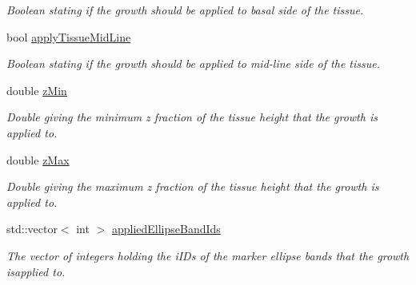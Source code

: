 \begin{DoxyCompactItemize}
\begin{DoxyCompactList}\small\item\em Boolean stating if the growth should be applied to basal side of the tissue. \end{DoxyCompactList}\item 
\hypertarget{classGrowthFunctionBase_a95cb51fffd8fbb1466510cc40853aeed}{}bool \hyperlink{classGrowthFunctionBase_a95cb51fffd8fbb1466510cc40853aeed}{apply\+Tissue\+Mid\+Line}\label{classGrowthFunctionBase_a95cb51fffd8fbb1466510cc40853aeed}

\begin{DoxyCompactList}\small\item\em Boolean stating if the growth should be applied to mid-\/line side of the tissue. \end{DoxyCompactList}\item 
\hypertarget{classGrowthFunctionBase_aa0d3867bc9072d342ca8b7f84800e04b}{}double \hyperlink{classGrowthFunctionBase_aa0d3867bc9072d342ca8b7f84800e04b}{z\+Min}\label{classGrowthFunctionBase_aa0d3867bc9072d342ca8b7f84800e04b}

\begin{DoxyCompactList}\small\item\em Double giving the minimum z fraction of the tissue height that the growth is applied to. \end{DoxyCompactList}\item 
\hypertarget{classGrowthFunctionBase_ac4696285be059f2dfacd195f0bbb5328}{}double \hyperlink{classGrowthFunctionBase_ac4696285be059f2dfacd195f0bbb5328}{z\+Max}\label{classGrowthFunctionBase_ac4696285be059f2dfacd195f0bbb5328}

\begin{DoxyCompactList}\small\item\em Double giving the maximum z fraction of the tissue height that the growth is applied to. \end{DoxyCompactList}\item 
\hypertarget{classGrowthFunctionBase_a905a7ac474d6d5340a357ea282d50581}{}std\+::vector$<$ int $>$ \hyperlink{classGrowthFunctionBase_a905a7ac474d6d5340a357ea282d50581}{applied\+Ellipse\+Band\+Ids}\label{classGrowthFunctionBase_a905a7ac474d6d5340a357ea282d50581}

\begin{DoxyCompactList}\small\item\em The vector of integers holding the i\+I\+Ds of the marker ellipse bands that the growth isapplied to. \end{DoxyCompactList}\end{DoxyCompactItemize}



